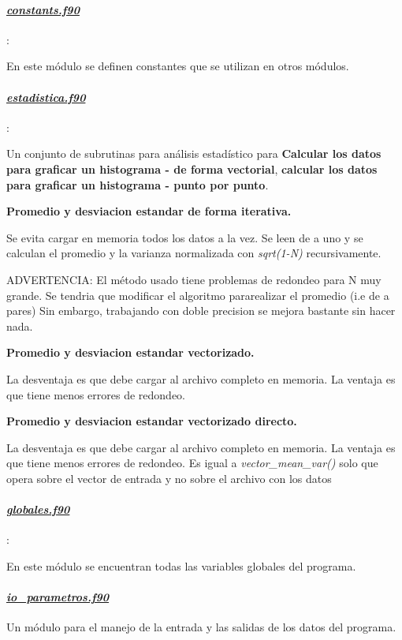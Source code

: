 \paragraph{\underline{\textit{constants.f90}}}:

 En este módulo se definen constantes que se utilizan en otros módulos. 

\paragraph{\underline{\textit{estadistica.f90}}}:

Un conjunto de subrutinas para análisis estad\'istico para 
\textbf{Calcular los datos para graficar un histograma - de forma vectorial},  
	  \textbf{calcular los datos para graficar un histograma - punto por punto}.

	  \textbf{Promedio y desviacion estandar de forma iterativa.}

 Se evita cargar en memoria todos los datos a la vez. Se leen de a uno y se 
 calculan el promedio y la varianza normalizada con \textit{sqrt(1-N)} recursivamente. 

 ADVERTENCIA: El método usado tiene problemas de redondeo para N muy grande.
 Se tendria que modificar el algoritmo pararealizar el promedio (i.e de a pares)
 Sin embargo, trabajando con doble precision se mejora bastante sin hacer nada.


 \textbf{Promedio y desviacion estandar vectorizado.}

 La desventaja es que debe cargar al archivo completo en memoria. La ventaja es
 que tiene menos errores de redondeo.


 \textbf{Promedio y desviacion estandar vectorizado directo.}

 La desventaja es que debe cargar al archivo completo en memoria. La ventaja es
 que tiene menos errores de redondeo.
 Es igual a \textit{vector\_mean\_var()} solo que opera sobre el vector de entrada
 y no sobre el archivo con los datos



\paragraph{\underline{\textit{globales.f90}}}:

En este  m\'odulo se encuentran  todas las variables globales del programa.
	
\paragraph{\underline{\textit{io\_parametros.f90}}}  
Un m\'odulo para el manejo de la entrada y las salidas de los datos del programa.


